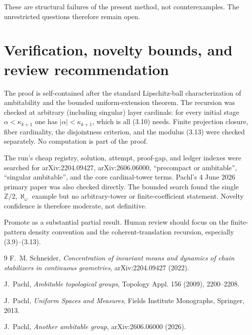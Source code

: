 \documentclass[11pt]{article}
\begin{document}
These are structural failures of the present method, not counterexamples.
The unrestricted questions therefore remain open.

\section{Verification, novelty bounds, and review recommendation}

The proof is self-contained after the standard Lipschitz-ball
characterization of ambitability and the bounded uniform-extension theorem.
The recursion was checked at arbitrary (including singular) layer cardinals:
for every initial stage $\alpha<\kappa_{k+1}$ one has
$|\alpha|<\kappa_{k+1}$, which is all (3.10) needs.  Finite projection closure,
fiber cardinality, the disjointness criterion, and the modulus (3.13) were
checked separately.  No computation is part of the proof.

The run's cheap registry, solution, attempt, proof-gap, and ledger indexes were
searched for arXiv:2204.09427, arXiv:2606.06000, ``precompact or ambitable'',
``singular ambitable'', and the core cardinal-tower terms.  Pachl's 4 June
2026 primary paper was also checked directly.  The bounded search found the
single $\mathbb Z/2,\aleph_\omega$ example but no arbitrary-tower or
finite-coefficient statement.  Novelty confidence is therefore moderate, not
definitive.

Promote as a substantial partial result.  Human review should focus on the
finite-pattern density convention and the coherent-translation recursion,
especially (3.9)--(3.13).

\begin{thebibliography}{9}
F.~M. Schneider,
\emph{Concentration of invariant means and dynamics of chain stabilizers in
continuous geometries}, arXiv:2204.09427 (2022).

J.~Pachl,
\emph{Ambitable topological groups},
Topology Appl. 156 (2009), 2200--2208.

J.~Pachl,
\emph{Uniform Spaces and Measures},
Fields Institute Monographs, Springer, 2013.

J.~Pachl,
\emph{Another ambitable group}, arXiv:2606.06000 (2026).
\end{thebibliography}
\end{document}
